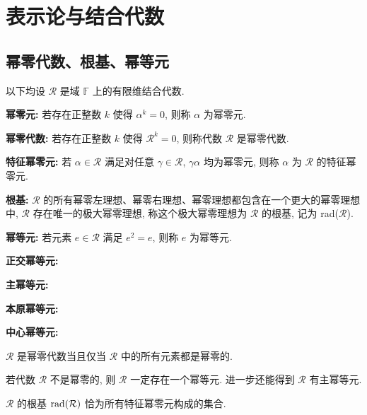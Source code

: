 \chapter{表示论与结合代数}
    \section{幂零代数、根基、幂等元}
        以下均设 $\mathcal{R}$ 是域 $\mathbb{F}$ 上的有限维结合代数.
        \begin{definition}
            {\bf 幂零元:} 若存在正整数 $k$ 使得 $\alpha^k = 0$, 则称 $\alpha$ 为幂零元.

            {\bf 幂零代数:} 若存在正整数 $k$ 使得 $\mathcal{R}^k = 0$, 则称代数 $\mathcal{R}$ 是幂零代数. 

            {\bf 特征幂零元:} 若 $\alpha\in\mathcal{R}$ 满足对任意 $\gamma\in\mathcal{R}$, $\gamma\alpha$ 均为幂零元, 
            则称 $\alpha$ 为 $\mathcal{R}$ 的特征幂零元.

            {\bf 根基:} $\mathcal{R}$ 的所有幂零左理想、幂零右理想、幂零理想都包含在一个更大的幂零理想中, 
            $\mathcal{R}$ 存在唯一的极大幂零理想, 称这个极大幂零理想为 $\mathcal{R}$ 的根基, 记为 {\rm rad(}$\mathcal{R}${\rm )}.
        \end{definition}
        \begin{definition}
            {\bf 幂等元:} 若元素 $e\in\mathcal{R}$ 满足 $e^2 = e$, 则称 $e$ 为幂等元.

            {\bf 正交幂等元:}

            {\bf 主幂等元:}

            {\bf 本原幂等元:}

            {\bf 中心幂等元:}
        \end{definition}
        \begin{proposition}
            $\mathcal{R}$ 是幂零代数当且仅当 $\mathcal{R}$ 中的所有元素都是幂零的.
        \end{proposition}
        \begin{proposition}
            若代数 $\mathcal{R}$ 不是幂零的, 则 $\mathcal{R}$ 一定存在一个幂等元.
            进一步还能得到 $\mathcal{R}$ 有主幂等元.
        \end{proposition}
        \begin{proposition}
            $\mathcal{R}$ 的根基 ${\rm rad}(\mathcal{R})$ 恰为所有特征幂零元构成的集合.
        \end{proposition}
        \begin{theorem}[特征幂零元的判定方法]
            
        \end{theorem}

